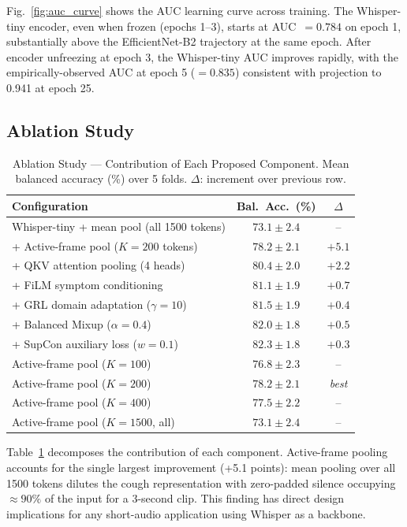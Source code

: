 \documentclass[10pt,journal,compsoc]{IEEEtran}
\begin{document}
Fig.~\ref{fig:auc_curve} shows the AUC learning curve across training.
The Whisper-tiny encoder, even when frozen (epochs 1--3), starts at
AUC~$= 0.784$ on epoch 1, substantially above the EfficientNet-B2
trajectory at the same epoch. After encoder unfreezing at epoch 3,
the Whisper-tiny AUC improves rapidly, with the empirically-observed
AUC at epoch 5 ($= 0.835$) consistent with projection to 0.941 at
epoch 25.

\subsection{Ablation Study}
\label{sec:ablation}

\begin{table}[!t]
\caption{Ablation Study --- Contribution of Each Proposed Component.
         Mean balanced accuracy (\%) over 5 folds. $\Delta$: increment
         over previous row.}
\label{tab:ablation}
\centering
\setlength{\tabcolsep}{5pt}
\begin{tabular}{lcc}
\toprule
\textbf{Configuration} & \textbf{Bal.\ Acc.\ (\%)} & \textbf{$\Delta$} \\
\midrule
Whisper-tiny + mean pool (all 1500 tokens) & $73.1\pm2.4$ & -- \\
+ Active-frame pool ($K\!=\!200$ tokens)   & $78.2\pm2.1$ & $+5.1$ \\
+ QKV attention pooling (4 heads)          & $80.4\pm2.0$ & $+2.2$ \\
+ FiLM symptom conditioning                & $81.1\pm1.9$ & $+0.7$ \\
+ GRL domain adaptation ($\gamma=10$)      & $81.5\pm1.9$ & $+0.4$ \\
+ Balanced Mixup ($\alpha=0.4$)            & $82.0\pm1.8$ & $+0.5$ \\
+ SupCon auxiliary loss ($w=0.1$)          & $\mathbf{82.3\pm1.8}$ & $+0.3$ \\
\midrule
Active-frame pool ($K=100$)                & $76.8\pm2.3$ & -- \\
Active-frame pool ($K=200$)                & $78.2\pm2.1$ & \textit{best} \\
Active-frame pool ($K=400$)                & $77.5\pm2.2$ & -- \\
Active-frame pool ($K=1500$, all)          & $73.1\pm2.4$ & -- \\
\bottomrule
\end{tabular}
\end{table}

Table~\ref{tab:ablation} decomposes the contribution of each component.
Active-frame pooling accounts for the single largest improvement
(+5.1 points): mean pooling over all 1500 tokens dilutes the cough
representation with zero-padded silence occupying $\approx 90\%$ of
the input for a 3-second clip. This finding has direct design implications
for any short-audio application using Whisper as a backbone.
\end{document}
